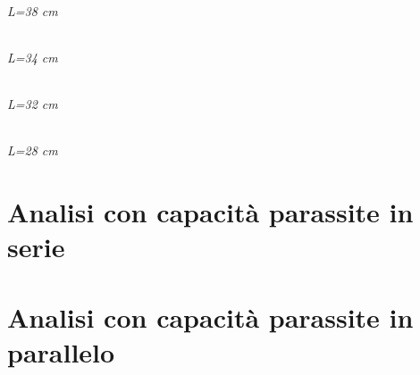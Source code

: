 \subparagraph*{L=38 cm}

\subparagraph*{L=34 cm}

\subparagraph*{L=32 cm}

\subparagraph*{L=28 cm}

\chapter{Analisi con capacità parassite in serie}
\chapter{Analisi con capacità parassite in parallelo}


